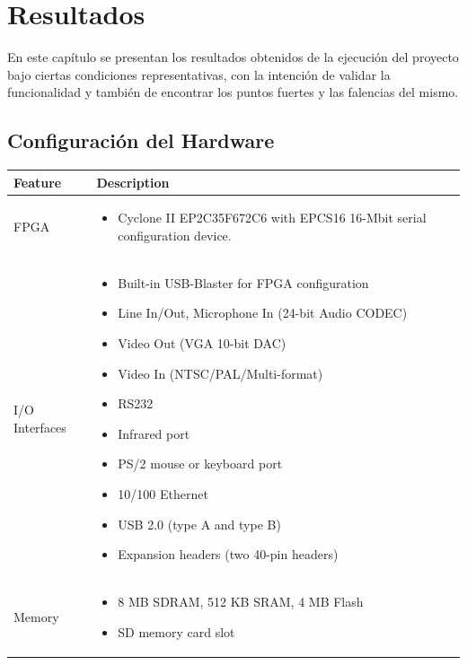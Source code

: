 \chapter{Resultados}

En este capítulo se presentan los resultados obtenidos de la ejecución del proyecto bajo ciertas condiciones representativas, con la intención de validar la funcionalidad y también de encontrar los puntos fuertes y las falencias del mismo.

\section{Configuración del Hardware}

\begin{center}
	\begin{longtable}{|l|p{4.75in}|} \hline
		\textbf{Feature} & \textbf{Description} \\ \hline
		FPGA & \begin{itemize}
			\item Cyclone II EP2C35F672C6 with EPCS16 16-Mbit serial configuration device.
			\end{itemize} \\ \hline
		I/O Interfaces &     \begin{itemize}
					\item Built-in USB-Blaster for FPGA configuration
    					\item Line In/Out, Microphone In (24-bit Audio CODEC)
   					\item Video Out (VGA 10-bit DAC)
   					\item Video In (NTSC/PAL/Multi-format)
   					\item RS232
    					\item Infrared port
   					\item PS/2 mouse or keyboard port
    					\item 10/100 Ethernet
   					\item USB 2.0 (type A and type B)
    					\item Expansion headers (two 40-pin headers)
				     \end{itemize} \\ \hline
		Memory & \begin{itemize}
					\item 8 MB SDRAM, 512 KB SRAM, 4 MB Flash
    					\item SD memory card slot
    			 \end{itemize} \\ \hline

\end{longtable}
\end{center}
